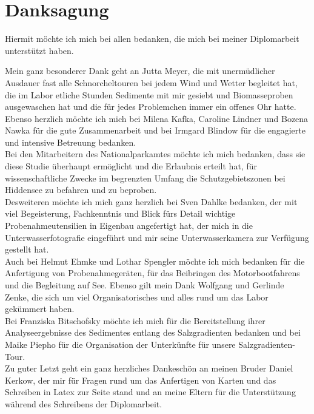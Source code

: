 \lstlistoflistings

\newpage

\section*{Danksagung}

Hiermit möchte ich mich bei allen bedanken, die mich bei meiner Diplomarbeit unterstützt haben.

Mein ganz besonderer Dank geht an Jutta Meyer, die mit unermüdlicher Ausdauer fast alle Schnorcheltouren bei jedem Wind und Wetter begleitet hat, die im Labor etliche Stunden Sedimente mit mir gesiebt und Biomasseproben ausgewaschen hat und die für jedes Problemchen immer ein offenes Ohr hatte. Ebenso herzlich möchte ich mich bei Milena Kafka, Caroline Lindner und Bozena Nawka für die gute Zusammenarbeit und bei Irmgard Blindow für die engagierte und intensive Betreuung bedanken. \\
Bei den Mitarbeitern des Nationalparkamtes möchte ich mich bedanken, dass sie diese Studie überhaupt ermöglicht und die Erlaubnis erteilt hat, für wissenschaftliche Zwecke im begrenzten Umfang die Schutzgebietszonen bei Hiddensee zu befahren und zu beproben.\\
Desweiteren möchte ich mich ganz herzlich bei Sven Dahlke bedanken, der mit viel Begeisterung, Fachkenntnis und Blick fürs Detail wichtige Probenahmeutensilien in Eigenbau angefertigt hat, der mich in die Unterwasserfotografie eingeführt und mir seine Unterwasserkamera zur Verfügung gestellt hat.\\ 
Auch bei Helmut Ehmke und Lothar Spengler möchte ich mich bedanken für die Anfertigung von Probenahmegeräten, für das Beibringen des Motorbootfahrens und die Begleitung auf See. Ebenso gilt mein Dank Wolfgang und Gerlinde Zenke, die sich um viel Organisatorisches und alles rund um das Labor gekümmert haben.\\
Bei Franziska Bitschofsky möchte ich mich für die Bereitstellung ihrer Analyseergebnisse des Sedimentes entlang des Salzgradienten bedanken und bei Maike Piepho für die Organisation der Unterkünfte für unsere Salzgradienten-Tour.\\
Zu guter Letzt geht ein ganz herzliches Dankeschön an meinen Bruder Daniel Kerkow, der mir für Fragen rund um das Anfertigen von Karten und das Schreiben in Latex zur Seite stand und an meine Eltern für die Unterstützung während des Schreibens der Diplomarbeit.\\


